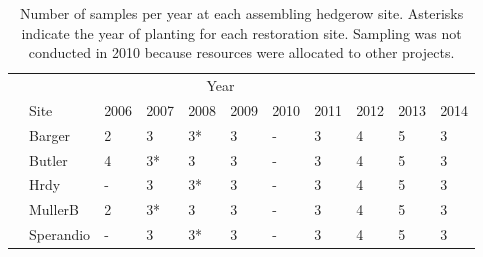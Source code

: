 \documentclass[12pt]{article}
\begin{document}
\begin{table}
  \renewcommand*\arraystretch{1.25}
  \centering
  \caption{Number of samples per year at each assembling hedgerow site. Asterisks indicate
    the year of planting for each restoration site. Sampling was not
    conducted in 2010 because resources were allocated to other
    projects.} 
  \begin{tabular}{lllllllllll}
    \hline
    \multicolumn{10}{c}{\hspace{10em}Year}\\
    & Site & 2006 & 2007 & 2008 & 2009 & 2010 & 2011 & 2012 & 2013 & 2014\\
    \hline
    &Barger & 2 & 3 & 3* & 3 & - & 3 & 4 & 5 & 3 \\
    &Butler & 4 & 3* & 3 & 3 & - & 3 & 4 & 5 & 3 \\ 
    &Hrdy & - & 3 & 3* & 3 & - & 3 & 4 & 5 & 3 \\
    &MullerB & 2 & 3* & 3 & 3 & - & 3 & 4 & 5 & 3 \\
    &Sperandio & - & 3 & 3* & 3 & - & 3 & 4 & 5 & 3 \\
    \hline
  \end{tabular}
  \label{tab:maturing}
\end{table}
\clearpage
\end{document}
